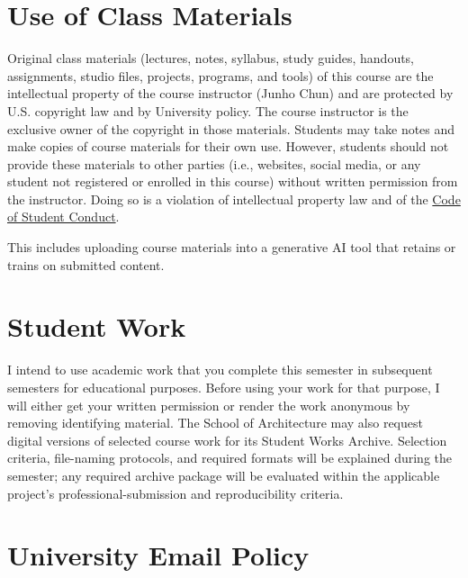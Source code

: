 \documentclass[11pt]{article}
\begin{document}
\section{Use of Class Materials}

Original class materials (lectures, notes, syllabus, study guides, handouts, assignments,
studio files, projects, programs, and tools) of this course are the intellectual property of
the course instructor (Junho Chun) and are protected by U.S. copyright law and by University
policy. The course instructor is the exclusive owner of the copyright in those materials.
Students may take notes and make copies of course materials for their own use. However,
students should not provide these materials to other parties (i.e., websites, social media, or
any student not registered or enrolled in this course) without written permission from the
instructor. Doing so is a violation of intellectual property law and of the
\href{https://policies.syr.edu/policies/academic-rules-student-responsibilities-and-services/code-of-student-conduct/}{Code
of Student Conduct}.

This includes uploading course materials into a generative AI tool that retains or trains on
submitted content.

\section{Student Work}

I intend to use academic work that you complete this semester in subsequent semesters for
educational purposes. Before using your work for that purpose, I will either get your written
permission or render the work anonymous by removing identifying material. The School of
Architecture may also request digital versions of selected course work for its Student Works
Archive. Selection criteria, file-naming protocols, and required formats will be explained
during the semester; any required archive package will be evaluated within the applicable
project's professional-submission and reproducibility criteria.

\section{University Email Policy}
\end{document}
